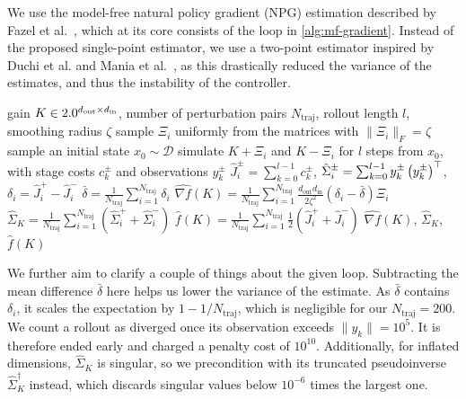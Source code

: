 We use the model-free natural policy gradient (NPG) estimation described by Fazel et al.~\cite[Sec.~4.2]{Fazel2018Global},
which at its core consists of the loop in \cref{alg:mf-gradient}. Instead of the proposed single-point estimator,
we use a two-point estimator inspired by Duchi et al. and Mania et al.~\cite{Duchi2015Optimal,Mania2018Simple},
as this drastically reduced the variance of the estimates, and thus the instability of the controller.

\begin{algorithm}[htbp]
    \caption{Two-point gradient estimation}
    \label{alg:mf-gradient}
    \begin{algorithmic}[1]
        \REQUIRE gain $K \in 2.0^{d_{\mathrm{out}} \times d_{\mathrm{in}}}$, number of perturbation pairs $N_{\mathrm{traj}}$,
        rollout length $l$, smoothing radius $\zeta$
            \STATE sample $\Xi_i$ uniformly from the matrices with $\lVert \Xi_i \rVert_F = \zeta$
            \STATE sample an initial state $x_0 \sim \mathcal{D}$
            \STATE simulate $K + \Xi_i$ and $K - \Xi_i$ for $l$ steps from $x_0$, with stage costs $c_k^{\pm}$ and
            observations $y_k^{\pm}$
            \STATE $\hat{J}_i^{\pm} = \sum_{k=0}^{l-1} c_k^{\pm}$, \quad
            $\hat{\Sigma}_i^{\pm} = \sum_{k=0}^{l-1} y_k^{\pm} \left( y_k^{\pm} \right)^{\top}$, \quad
            $\delta_i = \hat{J}_i^{+} - \hat{J}_i^{-}$
        \ENDFOR
        \STATE $\bar{\delta} = \frac{1}{N_{\mathrm{traj}}} \sum_{i=1}^{N_{\mathrm{traj}}} \delta_i$
        \STATE $\widehat{\nabla f}(K) = \frac{1}{N_{\mathrm{traj}}} \sum_{i=1}^{N_{\mathrm{traj}}}
        \frac{d_{\mathrm{out}} d_{\mathrm{in}}}{2 \zeta^2} \left( \delta_i - \bar{\delta} \right) \Xi_i$
        \STATE $\hat{\Sigma}_K = \frac{1}{N_{\mathrm{traj}}} \sum_{i=1}^{N_{\mathrm{traj}}} \left( \hat{\Sigma}_i^{+} + \hat{\Sigma}_i^{-} \right)$
        \STATE $\hat{f}(K) = \frac{1}{N_{\mathrm{traj}}} \sum_{i=1}^{N_{\mathrm{traj}}} \frac{1}{2} \left( \hat{J}_i^{+} + \hat{J}_i^{-} \right)$
        \RETURN $\widehat{\nabla f}(K)$, $\hat{\Sigma}_K$, $\hat{f}(K)$
    \end{algorithmic}
\end{algorithm}

We further aim to clarify a couple of things about the given loop.
Subtracting the mean difference $\bar{\delta}$ here helps us lower the variance of the estimate.
As $\bar{\delta}$ contains $\delta_i$, it scales the expectation by $1 - 1/N_{\mathrm{traj}}$,
which is negligible for our $N_{\mathrm{traj}} = 200$.
We count a rollout as diverged once its observation exceeds
$\lVert y_k \rVert = 10^{5}$. It is therefore ended early and charged a penalty cost of $10^{10}$.
Additionally, for inflated dimensions, $\hat{\Sigma}_K$ is singular, so we precondition with its
truncated pseudoinverse $\hat{\Sigma}_K^{\dagger}$ instead, which discards singular values below $10^{-6}$ times the largest one.

